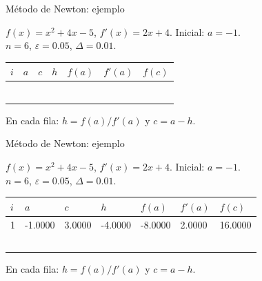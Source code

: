 \documentclass[main.tex]{subfiles}
\begin{document}
\begin{frame}[t]{Método de Newton: ejemplo}
\begin{minipage}[t][17mm]{\textwidth}\small
$f(x)=x^2+4x-5$, $f'(x)=2x+4$. Inicial: $a=-1$.\\
$n=6$, $\varepsilon=0.05$, $\Delta=0.01$.
\end{minipage}\begingroup\scriptsize\setlength{\tabcolsep}{2pt}
\begin{center}\begin{tabular}{|C{.04\textwidth}|*{6}{C{.135\textwidth}|}}\hline
$i$&$a$&$c$&$h$&$f(a)$&$f'(a)$&$f(c)$\\\hline
\rule{0pt}{5mm}&&&&&&\\\hline
\rule{0pt}{5mm}&&&&&&\\\hline
\rule{0pt}{5mm}&&&&&&\\\hline
\rule{0pt}{5mm}&&&&&&\\\hline
\rule{0pt}{5mm}&&&&&&\\\hline
\rule{0pt}{5mm}&&&&&&\\\hline
\end{tabular}\end{center}\endgroup\small En cada fila: $h=f(a)/f\prime(a)$ y $c=a-h$.
\end{frame}
\begin{frame}[t]{Método de Newton: ejemplo}
\begin{minipage}[t][17mm]{\textwidth}\small
$f(x)=x^2+4x-5$, $f'(x)=2x+4$. Inicial: $a=-1$.\\
$n=6$, $\varepsilon=0.05$, $\Delta=0.01$.
\end{minipage}\begingroup\scriptsize\setlength{\tabcolsep}{2pt}
\begin{center}\begin{tabular}{|C{.04\textwidth}|*{6}{C{.135\textwidth}|}}\hline
$i$&$a$&$c$&$h$&$f(a)$&$f'(a)$&$f(c)$\\\hline
\rule{0pt}{5mm}1&-1.0000&3.0000&-4.0000&-8.0000&2.0000&16.0000\\\hline
\rule{0pt}{5mm}&&&&&&\\\hline
\rule{0pt}{5mm}&&&&&&\\\hline
\rule{0pt}{5mm}&&&&&&\\\hline
\rule{0pt}{5mm}&&&&&&\\\hline
\rule{0pt}{5mm}&&&&&&\\\hline
\end{tabular}\end{center}\endgroup\small En cada fila: $h=f(a)/f\prime(a)$ y $c=a-h$.
\end{frame}
\end{document}

